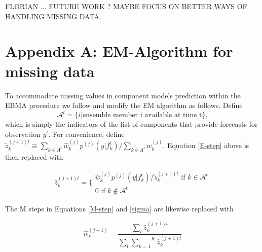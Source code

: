 \documentclass[12pt,fullpage,endnotes]{article}
\begin{document}

FLORIAN ... FUTURE WORK ?  MAYBE FOCUS ON BETTER WAYS OF HANDLING
MISSING DATA.


\singlespacing




 \newpage
 \appendix

\doublespacing

 \section*{Appendix A: EM-Algorithm for missing data}

To accommodate missing values in component models prediction within
the EBMA procedure we follow \citet{Fraley:2010} and modify the EM
algorithm as follows.  Define $$\mathcal{A}^t = \{i|\mbox{ensemble
  member i available at time t}\},$$\noindent which is simply the
indicators of the list of components that provide forecasts for
observation $y^t$.  For convenience, define $\tilde{z}_k^{(j+1)t}
\equiv {{\underset{k \in
      A^t}{\sum}}\hat{w}^{(j)}_kp^{(j)}(y|f_{k}^{t})}/{\underset{k \in
    A^t}\sum w_k^{(j)}}$.  Equation \ref{E-step} above is then
replaced with

\begin{equation}
\hat{z}^{(j+1)t}_{k} = \Bigg\{ \begin{array}{c} {\hat{w}^{(j)}_k p^{(j)}(y|f_{k}^{t})}/{\tilde{z}_k^{(j+1)t} } \mbox{ if } k \in \mathcal{A}^t\\ 0 \mbox{ if } k \notin \mathcal{A}^t \end{array}
\end{equation}



\noindent  The M steps in Equations \ref{M-step} and \ref{sigma} are likewise replaced with

\begin{equation}
\hat{w}^{(j+1)}_k=\frac{\underset{t}{\sum}\hat{z}^{(j+1)t}_{k}}{\underset{t}{\sum}\overset{K}{\underset{k=1}{ \sum}} \hat{z}_k^{(j+1)t}}
\end{equation}
\end{document}
